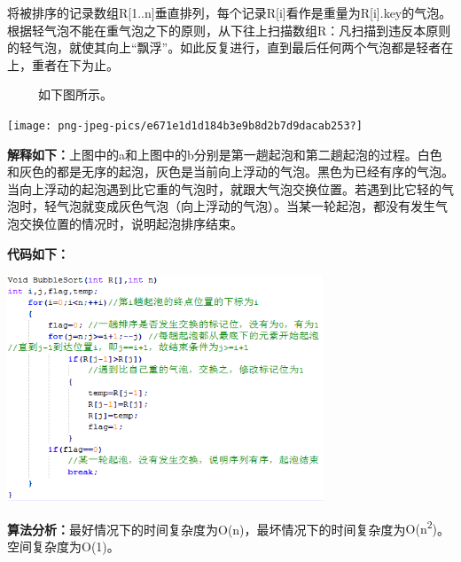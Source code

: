 {将被排序的记录数组R{[}1..n{]}垂直排列，每个记录R{[}i{]}看作是重量为R{[}i{]}.key的气泡。根据轻气泡不能在重气泡之下的原则，从下往上扫描数组R：凡扫描到违反本原则的轻气泡，就使其向上``飘浮''。如此反复进行，直到最后任何两个气泡都是轻者在上，重者在下为止。}

{~ ~ ~ 如下图所示。}

{\texttt{[image: png-jpeg-pics/e671e1d1d184b3e9b8d2b7d9dacab253?]}\\
\hspace*{0.333em}}

{\textbf{解释如下：}上图中的a和上图中的b分别是第一趟起泡和第二趟起泡的过程。白色和灰色的都是无序的起泡，灰色是当前向上浮动的气泡。黑色为已经有序的气泡。当向上浮动的起泡遇到比它重的气泡时，就跟大气泡交换位置。若遇到比它轻的气泡时，轻气泡就变成灰色气泡（向上浮动的气泡）。当某一轮起泡，都没有发生气泡交换位置的情况时，说明起泡排序结束。}

{\textbf{代码如下：}}{}

\includegraphics[width=3.70833in,height=2.65625in]{png-jpeg-pics/232C7FCF5B9C314B522DA40F90E151B7.png}

{\textbf{算法分析：}最好情况下的时间复杂度为}{O(n)}{，最坏情况下的时间复杂度为}{O(n\textsuperscript{2})}{。空间复杂度为}{O(1)}{。}
